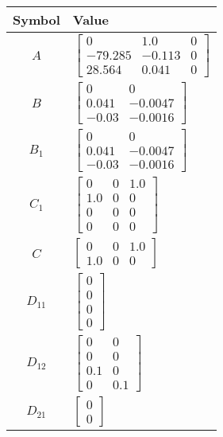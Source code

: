 \begin{tabular}{cl}
\hline
  Symbol  & Value                                                                                          \\
\hline
   $A$    & $\left[\begin{matrix}0 & 1.0 & 0\\-79.285 & -0.113 & 0\\28.564 & 0.041 & 0\end{matrix}\right]$ \\
   $B$    & $\left[\begin{matrix}0 & 0\\0.041 & -0.0047\\-0.03 & -0.0016\end{matrix}\right]$               \\
 $B_{1}$  & $\left[\begin{matrix}0 & 0\\0.041 & -0.0047\\-0.03 & -0.0016\end{matrix}\right]$               \\
 $C_{1}$  & $\left[\begin{matrix}0 & 0 & 1.0\\1.0 & 0 & 0\\0 & 0 & 0\\0 & 0 & 0\end{matrix}\right]$        \\
   $C$    & $\left[\begin{matrix}0 & 0 & 1.0\\1.0 & 0 & 0\end{matrix}\right]$                              \\
 $D_{11}$ & $\left[\begin{matrix}0\\0\\0\\0\end{matrix}\right]$                                            \\
 $D_{12}$ & $\left[\begin{matrix}0 & 0\\0 & 0\\0.1 & 0\\0 & 0.1\end{matrix}\right]$                        \\
 $D_{21}$ & $\left[\begin{matrix}0\\0\end{matrix}\right]$                                                  \\
\hline
\end{tabular}